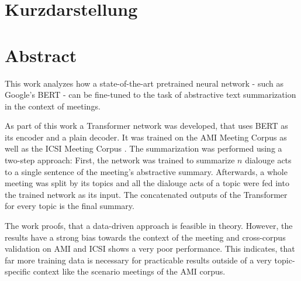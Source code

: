 \thispagestyle{empty}
\section*{Kurzdarstellung}
\label{sec:kurzdarstellung}

\blindtext


\section*{Abstract}
\label{sec:abstract}

This work analyzes how a state-of-the-art pretrained neural network - such as Google's BERT \cite{devlin2018bert} - can be fine-tuned to the task of abstractive text summarization in the context of meetings.

As part of this work a Transformer network \cite{1706.03762} was developed, that uses BERT as its encoder and a plain decoder.
It was trained on the AMI Meeting Corpus \cite{Mccowan05theami} as well as the ICSI Meeting Corpus \cite{Janin}.
The summarization was performed using a two-step approach:
First, the network was trained to summarize \(n\) dialouge acts to a single sentence of the meeting's abstractive summary.
Afterwards, a whole meeting was split by its topics and all the dialouge acts of a topic were fed into the trained network as its input.
The concatenated outputs of the Transformer for every topic is the final summary.

The work proofs, that a data-driven approach is feasible in theory.
However, the results have a strong bias towards the context of the meeting and cross-corpus validation on AMI and ICSI shows a very poor performance.
This indicates, that far more training data is necessary for practicable results outside of a very topic-specific context like the scenario meetings of the AMI corpus. 